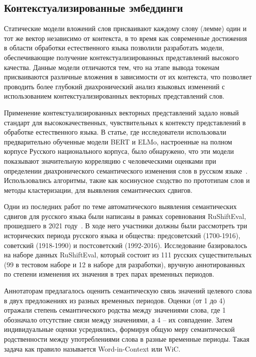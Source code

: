 \documentclass[LI,VKR]{HSEUniversity}
\begin{document}
\subsection{Контекстуализированные эмбеддинги}

Статические модели вложений слов присваивают каждому слову (лемме) один и тот же вектор
независимо от контекста, в то время как современные достижения в области обработки
естественного языка позволили разработать модели,
обеспечивающие получение контекстуализированных представлений высокого качества.
Данные модели отличаются тем, что на этапе вывода токенам присваиваются различные вложения
в зависимости от их контекста, что позволяет проводить более глубокий диахронический
анализ языковых изменений с использованием контекстуализированных векторных представлений слов.

Применение контекстуализированных векторных представлений задало новый стандарт для
высококачественных, чувствительных к контексту представлений в обработке естественного языка.
В статье, где исследователи использовали предварительно обученные модели BERT и ELMo,
настроенные на полном корпусе Русского национального корпуса, было обнаружено,
что эти модели показывают значительную корреляцию с человеческими оценками
при определении диахронического семантического изменения слов в русском языке~\cite{rodina2020elmo}.
Использовались алгоритмы, такие как косинусное сходство по прототипам слов и методы кластеризации,
для выявления семантических сдвигов.

Одни из последних работ по теме автоматического выявления семантических сдвигов для русского языка
были написаны в рамках соревнования RuShiftEval, прошедшего в 2021 году~\cite{rushifteval}.
В ходе него участники должны были рассмотреть три исторических периода русского языка и общества:
предсоветский (1700-1916), советский (1918-1990) и постсоветский (1992-2016).
Исследование базировалось на наборе данных RuShiftEval, который состоит из
111 русских существительных (99 в тестовом наборе и 12 в наборе для разработки),
вручную аннотированных по степени изменения их значения в трех парах временных периодов.

Аннотаторам предлагалось оценить семантическую связь значений целевого слова в двух предложениях
из разных временных периодов.
Оценки (от 1 до 4) отражали степень семантического родства между значениями слова, где
1 обозначало отсутствие связи между значениями, а 4 – их совпадение.
Затем индивидуальные оценки усреднялись, формируя общую меру семантической родственности между
употреблениями слова в разные временные периоды.
Такая задача как правило называется Word-in-Context или WiC.
\end{document}
